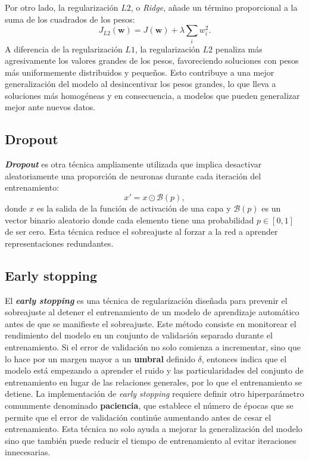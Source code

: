 Por otro lado, la regularización $L2$, o \textit{Ridge}, añade un término proporcional
a la suma de los cuadrados de los pesos:
\[
J_{L2}(\mathbf{w}) = J(\mathbf{w}) + \lambda \sum_{i}w_{i}^{2}.
\]
A diferencia de la regularización $L1$, la regularización $L2$ penaliza más agresivamente
los valores grandes de los pesos, favoreciendo soluciones con pesos más
uniformemente distribuidos y pequeños. Esto contribuye a una mejor generalización
del modelo al desincentivar los pesos grandes, lo que lleva a soluciones más
homogéneas y en consecuencia, a modelos que pueden generalizar mejor ante nuevos
datos.

\subsection{Dropout}

\textbf{\textit{Dropout}} \cite{srivastavan2014dropout} es otra técnica ampliamente
utilizada que implica desactivar aleatoriamente una proporción de neuronas durante
cada iteración del entrenamiento:
\begin{equation}
	x' = x \odot \mathcal{B}(p),
\end{equation}
donde $x$ es la salida de la función de activación de una capa y
$\mathcal{B}(p)$ es un vector binario aleatorio donde cada elemento tiene una
probabilidad $p \in [0,1]$ de ser cero. Esta técnica reduce el sobreajuste al forzar
a la red a aprender representaciones redundantes.

\subsection{Early stopping}

El \textbf{\textit{early stopping}} \cite{morgan1989generalization} es una técnica
de regularización diseñada para prevenir el sobreajuste al detener el entrenamiento
de un modelo de aprendizaje automático antes de que se manifieste el sobreajuste.
Este método consiste en monitorear el rendimiento del modelo en un conjunto de
validación separado durante el entrenamiento. Si el error de validación no solo comienza
a incrementar, sino que lo hace por un margen mayor a un \textbf{umbral} definido
$\delta$, entonces indica que el modelo está empezando a aprender el ruido y las
particularidades del conjunto de entrenamiento en lugar de las relaciones
generales, por lo que el entrenamiento se detiene. La implementación de \textit{early
	stopping} requiere definir otro hiperparámetro comunmente denominado \textbf{paciencia},
que establece el número de épocas que se permite que el error de validación continúe
aumentando antes de cesar el entrenamiento. Esta técnica no solo ayuda a mejorar
la generalización del modelo sino que también puede reducir el tiempo de
entrenamiento al evitar iteraciones innecesarias.

